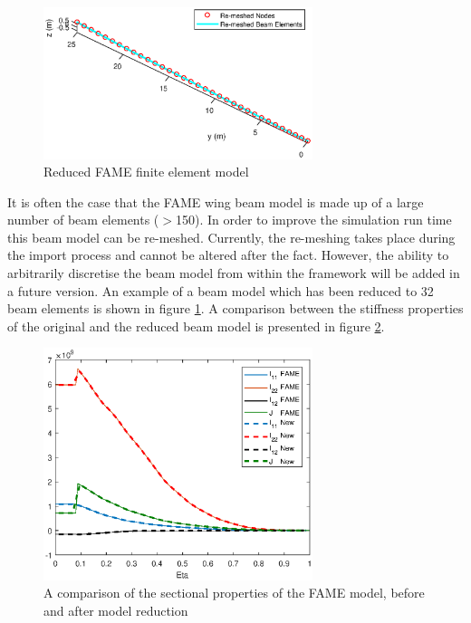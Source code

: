 \begin{enumerate}
\begin{figure}[h!]
\centering
\includegraphics[width = 0.7\textwidth]{FAMENastranModelRe-meshed}
\caption{Reduced FAME finite element model}\label{fig:FAMENastranModelReduced}
\end{figure}

It is often the case that the FAME wing beam model is made up of a large number of beam elements ($>$150). In order to improve the simulation run time this beam model can be re-meshed. Currently, the re-meshing takes place during the import process and cannot be altered after the fact. However, the ability to arbitrarily discretise the beam model from within the framework will be added in a future version. An example of a beam model which has been reduced to 32 beam elements is shown in figure \ref{fig:FAMENastranModelReduced}. A comparison between the stiffness properties of the original and the reduced beam model is presented in figure \ref{fig:OriginalvsReducedStiffness}.

\begin{figure}[h!]
\centering
\includegraphics[width = 0.7\textwidth]{StiffnessComparison}
\caption{A comparison of the sectional properties of the FAME model, before and after model reduction}\label{fig:OriginalvsReducedStiffness}
\end{figure}


\end{enumerate}
